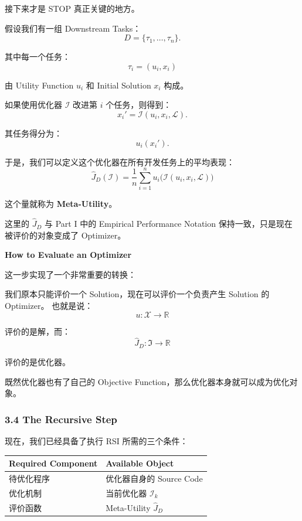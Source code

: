 接下来才是 STOP 真正关键的地方。

假设我们有一组 Downstream Tasks：
\[D=\{\tau_1,\ldots,\tau_n\}.\]

其中每一个任务：
\[\tau_i=(u_i,x_i)\]

由 Utility Function \(u_i\) 和 Initial Solution \(x_i\) 构成。

如果使用优化器 \(\mathcal I\) 改进第 \(i\) 个任务，则得到：
\[x_i'=\mathcal I(u_i,x_i,\mathcal L).\]

其任务得分为：
\[u_i(x_i').\]

于是，我们可以定义这个优化器在所有开发任务上的平均表现：
\[\boxed{
\widehat J_D(\mathcal I)
=
\frac1n\sum_{i=1}^{n}
u_i\big(
\mathcal I(u_i,x_i,\mathcal L)
\big)
}\]

这个量就称为 \textbf{Meta-Utility}。

这里的 \(\widehat J_D\) 与 Part I 中的 Empirical Performance Notation 保持一致，只是现在被评价的对象变成了 Optimizer。

\textbf{How to Evaluate an Optimizer}


这一步实现了一个非常重要的转换：

我们原本只能评价一个 Solution，现在可以评价一个负责产生 Solution 的 Optimizer。 也就是说：
\[u:\mathcal X\to\mathbb R\]

评价的是解，而：
\[\widehat J_D:\mathfrak I\to\mathbb R\]

评价的是优化器。

既然优化器也有了自己的 Objective Function，那么优化器本身就可以成为优化对象。

\hypertarget{part-3-37-0001-the-recursive-step}{%
\subsubsection{3.4 The Recursive Step}\label{part-3-37-0001-the-recursive-step}}

现在，我们已经具备了执行 RSI 所需的三个条件：

\begin{readertable}
\begin{longtable}[]{@{}
  >{\raggedright\arraybackslash}p{}
  >{\raggedright\arraybackslash}p{}@{}}
\toprule
Required Component & Available Object \\
\midrule
\endhead
待优化程序 & 优化器自身的 Source Code \\
优化机制 & 当前优化器 \(\mathcal I_k\) \\
评价函数 & Meta-Utility \(\widehat J_D\) \\
\bottomrule
\end{longtable}
\end{readertable}


